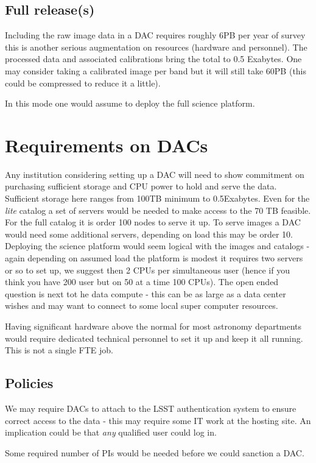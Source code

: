 \subsection{Full release(s)}
Including the raw image data in a DAC requires roughly 6PB per year of survey this is another serious augmentation on resources (hardware and personnel). The processed data and associated calibrations bring the total  to 0.5 Exabytes.  One may consider taking a  calibrated image per band
but it will still take 60PB (this could be compressed to reduce it a little).

In this mode one would assume to deploy the full science platform.


\section{Requirements on DACs}
Any institution considering setting up a DAC will need to show commitment on purchasing sufficient storage and CPU power to hold and serve the data.
Sufficient storage here ranges from 100TB minimum to 0.5Exabytes.  Even for the \emph{lite} catalog a set of servers would be needed to make access to the 70 TB feasible. For the full catalog it is order 100 nodes to serve it up.   To serve images a DAC would need some additional servers, depending on load this may be order 10.
Deploying the science platform would seem logical with the images and catalogs - again depending on assumed load the platform is modest it requires two servers or so to set up, we suggest then 2 CPUs per simultaneous user (hence if you think you have 200 user but on 50 at a time 100 CPUs).
The open ended question is next tot he data compute - this can be as large as a data center wishes and may want to connect to some local super computer resources.

Having significant hardware above the normal for most astronomy departments would require dedicated technical personnel to set it up and keep it all running. This is not a single FTE job.

\subsection{Policies}
We may require DACs to attach to the LSST authentication system to ensure correct access to the data - this may require some IT work at the hosting site. An implication could be that {\em any } qualified user could log in.

Some required number of PIs would be needed before we could sanction a DAC.

